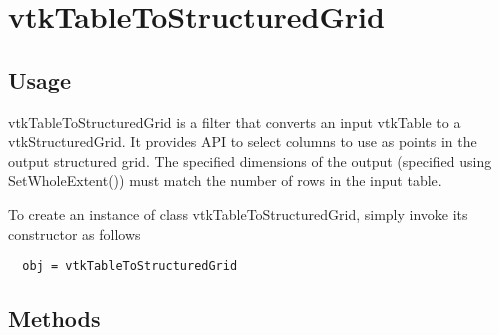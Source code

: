 \section{vtkTableToStructuredGrid}

\subsection{Usage}

 vtkTableToStructuredGrid is a filter that converts an input
 vtkTable to a vtkStructuredGrid. It provides API to select columns to use as
 points in the output structured grid. The specified dimensions of the output
 (specified using SetWholeExtent()) must match the number of rows in the input
 table.

To create an instance of class vtkTableToStructuredGrid, simply
invoke its constructor as follows
\begin{verbatim}
  obj = vtkTableToStructuredGrid
\end{verbatim}
\subsection{Methods}

